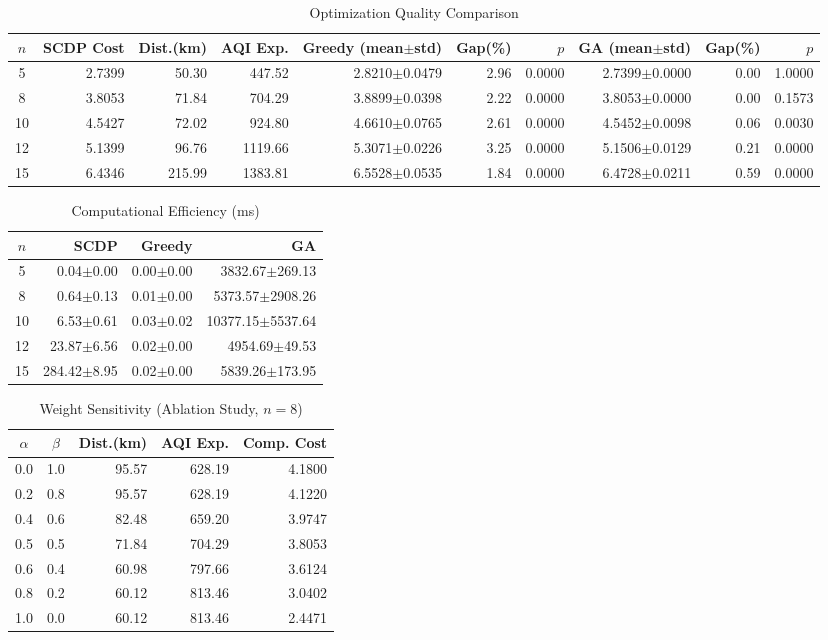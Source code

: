\begin{table}[htbp]
\centering
\caption{Optimization Quality Comparison}
\label{tab:quality}
\begin{tabular}{crrrrrrrrr}
\hline
$n$ & SCDP Cost & Dist.(km) & AQI Exp. & Greedy (mean$\pm$std) & Gap(\%) & $p$ & GA (mean$\pm$std) & Gap(\%) & $p$ \\
\hline
5 & 2.7399 & 50.30 & 447.52 & 2.8210$\pm$0.0479 & 2.96 & 0.0000 & 2.7399$\pm$0.0000 & 0.00 & 1.0000 \\
8 & 3.8053 & 71.84 & 704.29 & 3.8899$\pm$0.0398 & 2.22 & 0.0000 & 3.8053$\pm$0.0000 & 0.00 & 0.1573 \\
10 & 4.5427 & 72.02 & 924.80 & 4.6610$\pm$0.0765 & 2.61 & 0.0000 & 4.5452$\pm$0.0098 & 0.06 & 0.0030 \\
12 & 5.1399 & 96.76 & 1119.66 & 5.3071$\pm$0.0226 & 3.25 & 0.0000 & 5.1506$\pm$0.0129 & 0.21 & 0.0000 \\
15 & 6.4346 & 215.99 & 1383.81 & 6.5528$\pm$0.0535 & 1.84 & 0.0000 & 6.4728$\pm$0.0211 & 0.59 & 0.0000 \\
\hline
\end{tabular}
\end{table}

\begin{table}[htbp]
\centering
\caption{Computational Efficiency (ms)}
\label{tab:efficiency}
\begin{tabular}{crrr}
\hline
$n$ & SCDP & Greedy & GA \\
\hline
5 & 0.04$\pm$0.00 & 0.00$\pm$0.00 & 3832.67$\pm$269.13 \\
8 & 0.64$\pm$0.13 & 0.01$\pm$0.00 & 5373.57$\pm$2908.26 \\
10 & 6.53$\pm$0.61 & 0.03$\pm$0.02 & 10377.15$\pm$5537.64 \\
12 & 23.87$\pm$6.56 & 0.02$\pm$0.00 & 4954.69$\pm$49.53 \\
15 & 284.42$\pm$8.95 & 0.02$\pm$0.00 & 5839.26$\pm$173.95 \\
\hline
\end{tabular}
\end{table}

\begin{table}[htbp]
\centering
\caption{Weight Sensitivity (Ablation Study, $n{=}8$)}
\label{tab:sensitivity}
\begin{tabular}{ccrrr}
\hline
$\alpha$ & $\beta$ & Dist.(km) & AQI Exp. & Comp. Cost \\
\hline
0.0 & 1.0 & 95.57 & 628.19 & 4.1800 \\
0.2 & 0.8 & 95.57 & 628.19 & 4.1220 \\
0.4 & 0.6 & 82.48 & 659.20 & 3.9747 \\
0.5 & 0.5 & 71.84 & 704.29 & 3.8053 \\
0.6 & 0.4 & 60.98 & 797.66 & 3.6124 \\
0.8 & 0.2 & 60.12 & 813.46 & 3.0402 \\
1.0 & 0.0 & 60.12 & 813.46 & 2.4471 \\
\hline
\end{tabular}
\end{table}

